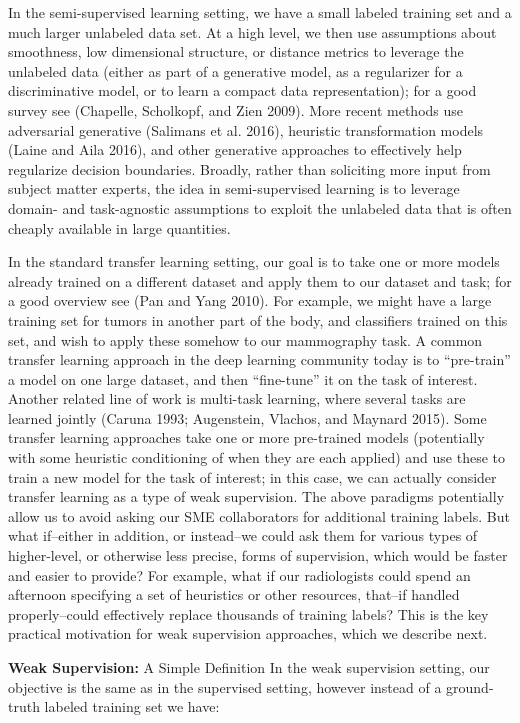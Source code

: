 \documentclass[openany]{book}
\begin{document}
In the semi-supervised learning setting, we have a small labeled training set and a much larger unlabeled data set. At a high level, we then use assumptions about smoothness, low dimensional structure, or distance metrics to leverage the unlabeled data (either as part of a generative model, as a regularizer for a discriminative model, or to learn a compact data representation); for a good survey see (Chapelle, Scholkopf, and Zien 2009). More recent methods use adversarial generative (Salimans et al. 2016), heuristic transformation models (Laine and Aila 2016), and other generative approaches to effectively help regularize decision boundaries. Broadly, rather than soliciting more input from subject matter experts, the idea in semi-supervised learning is to leverage domain- and task-agnostic assumptions to exploit the unlabeled data that is often cheaply available in large quantities.

In the standard transfer learning setting, our goal is to take one or more models already trained on a different dataset and apply them to our dataset and task; for a good overview see (Pan and Yang 2010). For example, we might have a large training set for tumors in another part of the body, and classifiers trained on this set, and wish to apply these somehow to our mammography task. A common transfer learning approach in the deep learning community today is to “pre-train” a model on one large dataset, and then “fine-tune” it on the task of interest. Another related line of work is multi-task learning, where several tasks are learned jointly (Caruna 1993; Augenstein, Vlachos, and Maynard 2015). Some transfer learning approaches take one or more pre-trained models (potentially with some heuristic conditioning of when they are each applied) and use these to train a new model for the task of interest; in this case, we can actually consider transfer learning as a type of weak supervision.
The above paradigms potentially allow us to avoid asking our SME collaborators for additional training labels. But what if–either in addition, or instead–we could ask them for various types of higher-level, or otherwise less precise, forms of supervision, which would be faster and easier to provide? For example, what if our radiologists could spend an afternoon specifying a set of heuristics or other resources, that–if handled properly–could effectively replace thousands of training labels? This is the key practical motivation for weak supervision approaches, which we describe next.

\textbf{
Weak Supervision:} A Simple Definition
In the weak supervision setting, our objective is the same as in the supervised setting, however instead of a ground-truth labeled training set we have:
\end{document}
